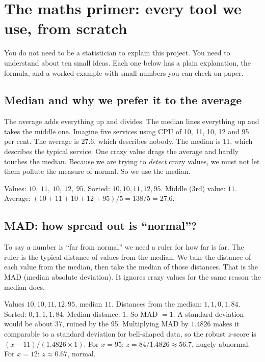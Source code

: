 \chapter{The maths primer: every tool we use, from scratch}
\label{ch:primer}

You do not need to be a statistician to explain this project. You need to understand about ten small ideas. Each one below has a plain explanation, the formula, and a worked example with small numbers you can check on paper.

\section{Median and why we prefer it to the average}
\begin{simplebox}
The average adds everything up and divides. The median lines everything up and takes the middle one. Imagine five services using CPU of 10, 11, 10, 12 and 95 per cent. The average is 27.6, which describes nobody. The median is 11, which describes the typical service. One crazy value drags the average and hardly touches the median. Because we are trying to \emph{detect} crazy values, we must not let them pollute the measure of normal. So we use the median.
\end{simplebox}
\begin{examplebox}[Check it]
Values: $10,\ 11,\ 10,\ 12,\ 95$. Sorted: $10,10,11,12,95$. Middle (3rd) value: $11$. Average: $(10+11+10+12+95)/5=138/5=27.6$.
\end{examplebox}

\section{MAD: how spread out is ``normal''?}
\begin{simplebox}
To say a number is ``far from normal'' we need a ruler for how far is far. The ruler is the typical distance of values from the median. We take the distance of each value from the median, then take the median of those distances. That is the MAD (median absolute deviation). It ignores crazy values for the same reason the median does.
\end{simplebox}
\begin{examplebox}[Check it]
Values $10,10,11,12,95$, median $11$. Distances from the median: $1,1,0,1,84$. Sorted: $0,1,1,1,84$. Median distance: $1$. So MAD $=1$. A standard deviation would be about 37, ruined by the 95. Multiplying MAD by $1.4826$ makes it comparable to a standard deviation for bell-shaped data, so the robust $z$-score is $(x-11)/(1.4826\times1)$. For $x=95$: $z=84/1.4826\approx56.7$, hugely abnormal. For $x=12$: $z\approx0.67$, normal.
\end{examplebox}


